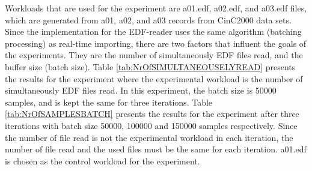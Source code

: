 Workloads that are used for the experiment are a01.edf, a02.edf, and a03.edf files, which are generated from a01, a02, and a03 records from CinC2000 data sets. Since the implementation for the EDF-reader uses the same algorithm (batching processing) as real-time importing, there are two factors that influent the goals of the experiments. They are the number of simultaneously EDF files read, and the buffer size (batch size). Table \ref{tab:NrOfSIMULTANEOUSELYREAD} presents the results for the experiment where the experimental workload is the number of simultaneously EDF files read. In this experiment, the batch size is 50000 samples, and is kept the same for three iterations. Table \ref{tab:NrOfSAMPLESBATCH} presents the results for the experiment after three iterations with batch size 50000, 100000 and 150000 samples respectively. Since the number of file read is not the experimental workload in each iteration, the number of file read and the used files must be the same for each iteration. a01.edf is chosen as the control workload for the experiment.
